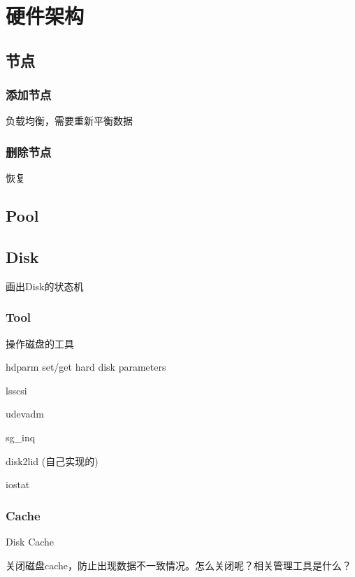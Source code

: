\chapter{硬件架构}

\section{节点}

\subsection{添加节点}

负载均衡，需要重新平衡数据

\subsection{删除节点}

恢复


\section{Pool}

\section{Disk}

画出Disk的状态机

\subsection{Tool}

操作磁盘的工具
\begin{enumbox}
\item hdparm set/get hard disk parameters
\item lsscsi
\item udevadm
\item sg\_inq
\item disk2lid (自己实现的)
\item iostat
\end{enumbox}

\subsection{Cache}

Disk Cache

关闭磁盘cache，防止出现数据不一致情况。怎么关闭呢？相关管理工具是什么？

